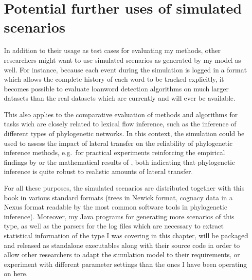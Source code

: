 \section{Potential further uses of simulated scenarios}
In addition to their usage as test cases for evaluating my methods, other researchers might want to use simulated scenarios as generated by my model as well. For instance, because each event during the simulation is logged in a format which allows the complete history of each word to be tracked explicitly, it becomes possible to evaluate loanword detection algorithms on much larger datasets than the real datasets which are currently and will ever be available.

This also applies to the comparative evaluation of methods and algorithms for tasks wich are closely related to lexical flow inference, such as the inference of different types of phylogenetic networks. In this context, the simulation could be used to assess the impact of lateral transfer on the reliability of phylogenetic inference methods, e.g.\ for practical experiments reinforcing the empirical findings by \cite{greenhill_ea_2009} or the mathematical results of \cite{roch_snir_2012}, both indicating that phylogenetic inference is quite robust to realistic amounts of lateral transfer.

For all these purposes, the simulated scenarios are distributed together with this book in various standard formats (trees in Newick format, cognacy data in a Nexus format readable by the most common software tools in phylogenetic inference). Moreover, my Java programs for generating more scenarios of this type, as well as the parsers for the log files which are necessary to extract statistical information of the type I was covering in this chapter, will be packaged and released as standalone executables along with their source code in order to allow other researchers to adapt the simulation model to their requirements, or experiment with different parameter settings than the ones I have been operating on here.
